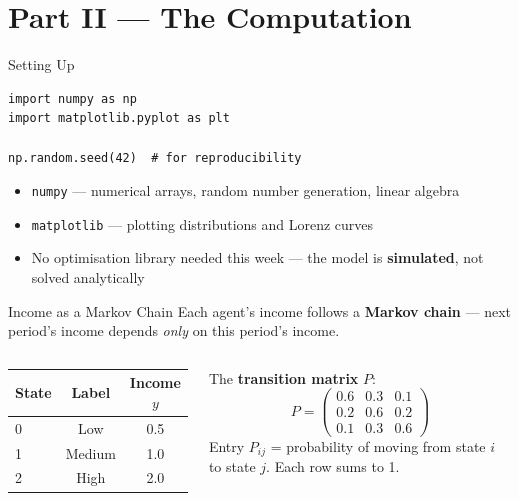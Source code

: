 \documentclass[aspectratio=169, 10pt]{beamer}
\begin{document}
\section{Part II --- The Computation}

\begin{frame}[fragile]{Setting Up}
\begin{lstlisting}
import numpy as np
import matplotlib.pyplot as plt

np.random.seed(42)  # for reproducibility
\end{lstlisting}
\vspace{0.5em}
\begin{itemize}
  \item \texttt{numpy} --- numerical arrays, random number generation,
        linear algebra
  \item \texttt{matplotlib} --- plotting distributions and Lorenz curves
  \item No optimisation library needed this week --- the model is
        \textbf{simulated}, not solved analytically
\end{itemize}
\end{frame}

\begin{frame}{Income as a Markov Chain}
Each agent's income follows a \textbf{Markov chain} --- next period's
income depends \textit{only} on this period's income.
\vspace{0.5em}
\begin{columns}[T]
\begin{center}
\begin{tabular}{lcc}
\toprule
State & Label & Income $y$ \\
\midrule
0 & Low    & 0.5 \\
1 & Medium & 1.0 \\
2 & High   & 2.0 \\
\bottomrule
\end{tabular}
\end{center}
The \textbf{transition matrix} $P$:
\[
P = \begin{pmatrix}
0.6 & 0.3 & 0.1 \\
0.2 & 0.6 & 0.2 \\
0.1 & 0.3 & 0.6
\end{pmatrix}
\]
Entry $P_{ij}$ = probability of moving from state $i$ to state $j$.
Each row sums to 1.
\end{columns}
\end{frame}
\end{document}
